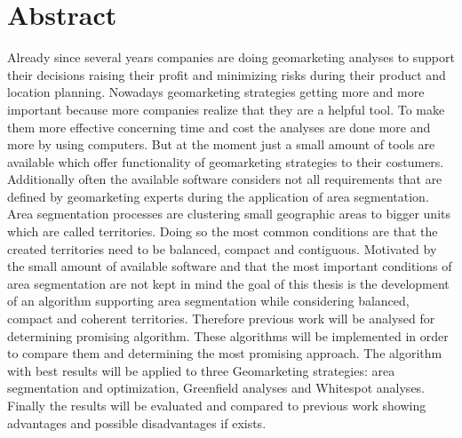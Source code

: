 \section*{Abstract}

Already since several years companies are doing geomarketing analyses to support their decisions raising their profit and minimizing risks during their product and location planning. Nowadays geomarketing strategies getting more and more important because more companies realize that they are a helpful tool. To make them more effective concerning time and cost the analyses are done more and more by using computers. But at the moment just a small amount of tools are available which offer functionality of geomarketing strategies to their costumers. Additionally often the available software considers not all requirements that are defined by geomarketing experts during the application of area segmentation. Area segmentation processes are clustering small geographic areas to bigger units which are called territories. Doing so the most common conditions are that the created territories need to be balanced, compact and contiguous.  Motivated by the small amount of available software and that the most important conditions of area segmentation are not kept in mind the goal of this thesis is the development of an algorithm supporting area segmentation while considering balanced, compact and coherent territories. Therefore previous work will be analysed for determining promising algorithm. These algorithms will be implemented in order to compare them and determining the most promising approach. The algorithm with best results will be applied to three Geomarketing strategies: area segmentation and optimization, Greenfield analyses and Whitespot analyses. Finally the results will be evaluated and compared to previous work showing advantages and possible disadvantages if exists. 